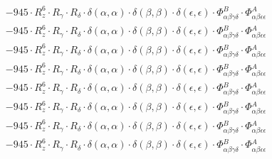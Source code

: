 \documentclass{article}
\begin{document}
\begin{subequations}
\begin{gather}
\begin{array}{c}
 \\[0.2em] 		 - 945 \cdot R_{z}^{6} \cdot R_{\gamma{}} \cdot R_{\delta{}} \cdot \delta{}\left(\alpha{}, \alpha{}\right) \cdot \delta{}\left(\beta{}, \beta{}\right) \cdot \delta{}\left(\epsilon{}, \epsilon{}\right) \cdot \Phi{}^{B}_{\alpha{}\beta{}\gamma{}\delta{}} \cdot \Phi{}^{A}_{\alpha{}\beta{}\epsilon{}\epsilon{}} 
 \\[0.2em] 		 - 945 \cdot R_{z}^{6} \cdot R_{\gamma{}} \cdot R_{\delta{}} \cdot \delta{}\left(\alpha{}, \alpha{}\right) \cdot \delta{}\left(\beta{}, \beta{}\right) \cdot \delta{}\left(\epsilon{}, \epsilon{}\right) \cdot \Phi{}^{B}_{\alpha{}\beta{}\gamma{}\delta{}} \cdot \Phi{}^{A}_{\alpha{}\beta{}\epsilon{}\epsilon{}} 
 \\[0.2em] 		 - 945 \cdot R_{z}^{6} \cdot R_{\gamma{}} \cdot R_{\delta{}} \cdot \delta{}\left(\alpha{}, \alpha{}\right) \cdot \delta{}\left(\beta{}, \beta{}\right) \cdot \delta{}\left(\epsilon{}, \epsilon{}\right) \cdot \Phi{}^{B}_{\alpha{}\beta{}\gamma{}\delta{}} \cdot \Phi{}^{A}_{\alpha{}\beta{}\epsilon{}\epsilon{}} 
 \\[0.2em] 		 - 945 \cdot R_{z}^{6} \cdot R_{\gamma{}} \cdot R_{\delta{}} \cdot \delta{}\left(\alpha{}, \alpha{}\right) \cdot \delta{}\left(\beta{}, \beta{}\right) \cdot \delta{}\left(\epsilon{}, \epsilon{}\right) \cdot \Phi{}^{B}_{\alpha{}\beta{}\gamma{}\delta{}} \cdot \Phi{}^{A}_{\alpha{}\beta{}\epsilon{}\epsilon{}} 
 \\[0.2em] 		 - 945 \cdot R_{z}^{6} \cdot R_{\gamma{}} \cdot R_{\delta{}} \cdot \delta{}\left(\alpha{}, \alpha{}\right) \cdot \delta{}\left(\beta{}, \beta{}\right) \cdot \delta{}\left(\epsilon{}, \epsilon{}\right) \cdot \Phi{}^{B}_{\alpha{}\beta{}\gamma{}\delta{}} \cdot \Phi{}^{A}_{\alpha{}\beta{}\epsilon{}\epsilon{}} 
 \\[0.2em] 		 - 945 \cdot R_{z}^{6} \cdot R_{\gamma{}} \cdot R_{\delta{}} \cdot \delta{}\left(\alpha{}, \alpha{}\right) \cdot \delta{}\left(\beta{}, \beta{}\right) \cdot \delta{}\left(\epsilon{}, \epsilon{}\right) \cdot \Phi{}^{B}_{\alpha{}\beta{}\gamma{}\delta{}} \cdot \Phi{}^{A}_{\alpha{}\beta{}\epsilon{}\epsilon{}} 
 \\[0.2em] 		 - 945 \cdot R_{z}^{6} \cdot R_{\gamma{}} \cdot R_{\delta{}} \cdot \delta{}\left(\alpha{}, \alpha{}\right) \cdot \delta{}\left(\beta{}, \beta{}\right) \cdot \delta{}\left(\epsilon{}, \epsilon{}\right) \cdot \Phi{}^{B}_{\alpha{}\beta{}\gamma{}\delta{}} \cdot \Phi{}^{A}_{\alpha{}\beta{}\epsilon{}\epsilon{}} 
 \\[0.2em] 		 - 945 \cdot R_{z}^{6} \cdot R_{\gamma{}} \cdot R_{\delta{}} \cdot \delta{}\left(\alpha{}, \alpha{}\right) \cdot \delta{}\left(\beta{}, \beta{}\right) \cdot \delta{}\left(\epsilon{}, \epsilon{}\right) \cdot \Phi{}^{B}_{\alpha{}\beta{}\gamma{}\delta{}} \cdot \Phi{}^{A}_{\alpha{}\beta{}\epsilon{}\epsilon{}} 

\end{array}
\end{gather}
\end{subequations}
\end{document}
